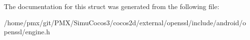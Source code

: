 The documentation for this struct was generated from the following file\+:\begin{DoxyCompactItemize}
\item 
/home/pmx/git/\+P\+M\+X/\+Simu\+Cocos3/cocos2d/external/openssl/include/android/openssl/engine.\+h\end{DoxyCompactItemize}
